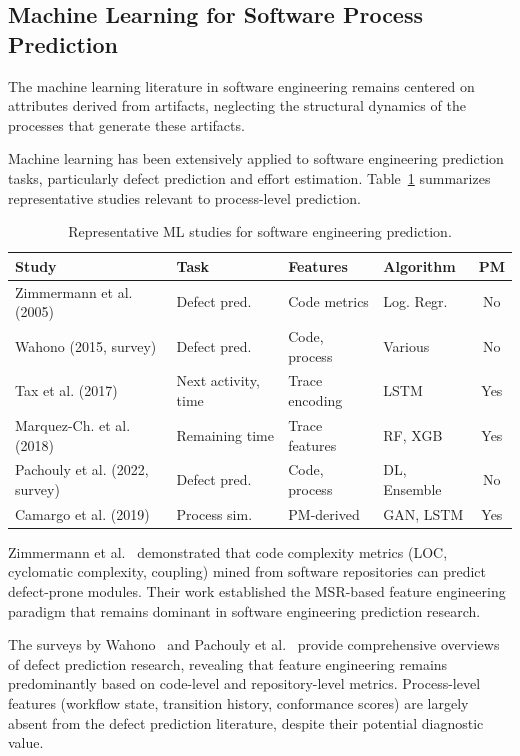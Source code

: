 \subsection{Machine Learning for Software Process Prediction}
\label{sec:rw-ml-se}
The machine learning literature in software engineering remains centered on attributes derived from artifacts, neglecting the structural dynamics of the processes that generate these artifacts.

Machine learning has been extensively applied to software engineering
prediction tasks, particularly defect prediction and effort estimation.
Table~\ref{tab:ml-se-studies} summarizes representative studies relevant
to process-level prediction.

\begin{table}[htb]
\centering
\caption{Representative ML studies for software engineering prediction.}
\label{tab:ml-se-studies}
\begin{tabular}{p{3.5cm}p{2.2cm}p{2.5cm}p{2.0cm}c}
\toprule
\textbf{Study} & \textbf{Task} & \textbf{Features} &
\textbf{Algorithm} & \textbf{PM} \\
\midrule
Zimmermann et al. (2005) & Defect pred. & Code metrics & Log. Regr. & No \\
Wahono (2015, survey) & Defect pred. & Code, process & Various & No \\
Tax et al. (2017) & Next activity, time & Trace encoding & LSTM & Yes \\
Marquez-Ch. et al. (2018) & Remaining time & Trace features & RF, XGB & Yes \\
Pachouly et al. (2022, survey) & Defect pred. & Code, process & DL, Ensemble & No \\
Camargo et al. (2019) & Process sim. & PM-derived & GAN, LSTM & Yes \\
\bottomrule
\end{tabular}
\end{table}

Zimmermann et al.~\cite{Zimmermann2005MiningVersionHistories} demonstrated that code
complexity metrics (LOC, cyclomatic complexity, coupling) mined from
software repositories can predict defect-prone modules. Their work
established the MSR-based feature engineering paradigm that remains
dominant in software engineering prediction research.

The surveys by Wahono~\cite{Wahono2015} and Pachouly et
al.~\cite{pachouly2022} provide comprehensive overviews of
defect prediction research, revealing that feature engineering remains
predominantly based on code-level and repository-level metrics.
Process-level features (workflow state, transition history, conformance
scores) are largely absent from the defect prediction literature,
despite their potential diagnostic value.


